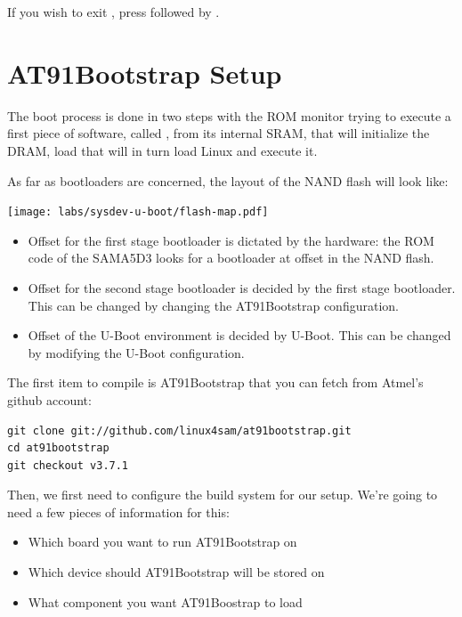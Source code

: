 If you wish to exit , press \code{[Ctrl][a]} followed by
\code{[Ctrl][x]}.

\section{AT91Bootstrap Setup}

The boot process is done in two steps with the ROM monitor trying to
execute a first piece of software, called , from
its internal SRAM, that will initialize the DRAM, load 
that will in turn load Linux and execute it.

As far as bootloaders are concerned, the layout of the NAND flash will
look like:

\begin{center}
  \texttt{[image: labs/sysdev-u-boot/flash-map.pdf]}
\end{center}

\begin{itemize}
\item Offset  for the first stage bootloader is dictated by
  the hardware: the ROM code of the SAMA5D3 looks for a bootloader at
  offset  in the NAND flash.
\item Offset  for the second stage bootloader is decided
  by the first stage bootloader. This can be changed by changing the
  AT91Bootstrap configuration.
\item Offset  of the U-Boot environment is decided by
  U-Boot. This can be changed by modifying the U-Boot configuration.
\end{itemize}

The first item to compile is AT91Bootstrap that you can fetch from
Atmel's github account:

\begin{verbatim}
git clone git://github.com/linux4sam/at91bootstrap.git
cd at91bootstrap
git checkout v3.7.1
\end{verbatim}

Then, we first need to configure the build system for our setup. We're
going to need a few pieces of information for this:

\begin{itemize}
\item Which board you want to run AT91Bootstrap on
\item Which device should AT91Bootstrap will be stored on
\item What component you want AT91Boostrap to load
\end{itemize}

